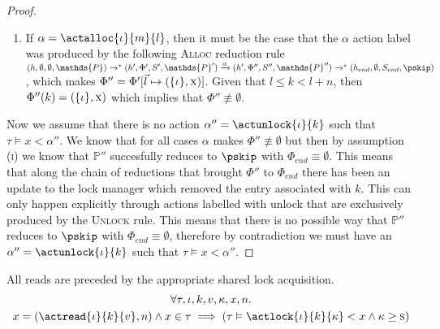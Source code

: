 \begin{proof}
\begin{enumerate}
	\item If $\alpha = \actalloc{\iota}{m}{l}$, then it must be the case that the $\alpha$ action label was produced by the following \textsc{Alloc} reduction rule $(h, \emptyset, \emptyset, \mathds{P}) \rightarrow^* (h', \Phi', S', \mathds{P}') \xrightarrow{\alpha} (h', \Phi'', S'', \mathds{P}'') \rightarrow^* (h_{end}, \emptyset, S_{end}, \pskip)$, which makes $\Phi'' = \Phi'[\vec{l} \mapsto (\{\iota\}, \textsc{x})]$. Given that $l \leq k < l + n$, then $\Phi''(k) = (\{\iota\}, \textsc{x})$ which implies that $\Phi'' \not\equiv \emptyset$.
\end{enumerate}

Now we assume that there is no action $\alpha'' = \actunlock{\iota}{k}$ such that $\tau \vDash x < \alpha''$. We know that for all cases $\alpha$ makes $\Phi'' \not\equiv \emptyset$ but then by assumption (\textsc{i}) we know that $\mathds{P}''$ succesfully reduces to $\pskip$ with $\Phi_{end} \equiv \emptyset$. This means that along the chain of reductions that brought $\Phi''$ to $\Phi_{end}$ there has been an update to the lock manager which removed the entry associated with $k$. This can only happen explicitly through actions labelled with \textsf{unlock} that are exclusively produced by the \textsc{Unlock} rule. This means that there is no possible way that $\mathds{P}''$ reduces to $\pskip$ with $\Phi_{end} \equiv \emptyset$, therefore by contradiction we must have an $\alpha'' = \actunlock{\iota}{k}$ such that $\tau \vDash x < \alpha''$.
\end{proof}

\lem \label{lem:read} All reads are preceded by the appropriate shared lock acquisition.
\begin{gather*}
\forall \tau, \iota, k, v, \kappa, x, n \ldotp \\
x = (\actread{\iota}{k}{v}, n) \land x \in \tau \implies \left( \tau \vDash \actlock{\iota}{k}{\kappa} < x \land \kappa \geq \textsc{s} \right)
\end{gather*}

